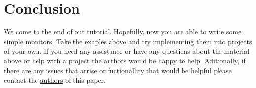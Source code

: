 \section{Conclusion}
\label{conclusion}
	We come to the end of out tutorial. Hopefully, now
you are able to write some simple monitors. Take the exaples above and try
implementing them into projects of your own. If you need any assistance or have
any questions about the material above or help with a project the authors would
be happy to help. Aditionally, if there are any issues that arrise or
fuctionallity that would be helpful please contact the \hyperref[sec:Abstract]{authors} of this paper.
\newpage
